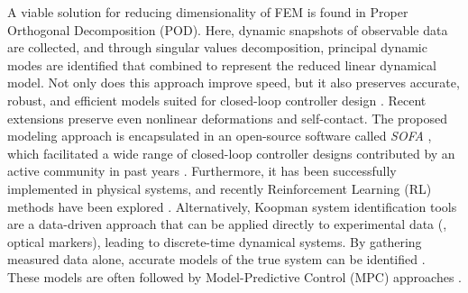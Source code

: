 A viable solution for reducing dimensionality of FEM is found in Proper Orthogonal Decomposition (POD). Here, dynamic snapshots of observable data are collected, and through singular values decomposition, principal dynamic modes are identified that combined  to represent the reduced linear dynamical model. Not only does this approach improve speed, but it also preserves accurate, robust, and efficient models suited for closed-loop controller design \cite{Goury2018}. Recent extensions \cite{Sifakis2012Aug} preserve even nonlinear deformations and self-contact. The proposed modeling approach is encapsulated in an open-source software called \textit{SOFA} \cite{Duriez2016, Coevoet2017Feb}, which facilitated a wide range of closed-loop controller designs contributed by an active community in past years \cite{Largilliere2015,Goury2018,Duriez2016,Wu2021Feb,Li2022Feb}. Furthermore, it has been successfully implemented in physical systems, and recently Reinforcement Learning (RL) methods have been explored \cite{Schegg2022}. Alternatively, Koopman system identification tools are a data-driven approach that can be applied directly to experimental data (\ie, optical markers), leading to discrete-time dynamical systems. By gathering measured data alone, accurate models of the true system can be identified \cite{Bruder2019,Komeno2022Oct}. These models are often followed by Model-Predictive Control (MPC) approaches \cite{Bruder2020Dec,Bruder2019}. 


